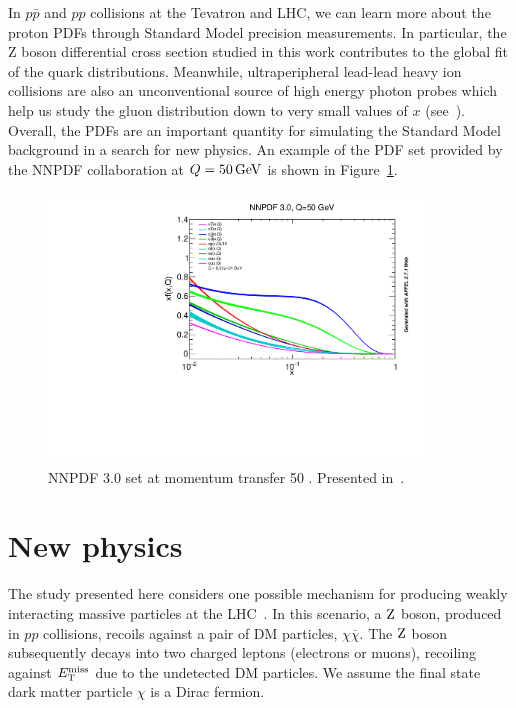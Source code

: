 In $p\bar{p}$ and $pp$ collisions at the Tevatron and LHC,
we can learn more about the proton PDFs through Standard Model precision measurements.
In particular, the Z boson differential cross section studied in this work contributes to the global fit of the quark distributions.
Meanwhile, ultraperipheral lead-lead heavy ion collisions are also an unconventional source of high energy photon probes which help us study the gluon distribution down to very small values of $x$ (see~\cite{Baltz:2007kq}).
Overall, the PDFs are an important quantity for simulating the Standard Model background in a search for new physics.
An example of the PDF set provided by the NNPDF collaboration at $Q=50 \,\text{Ge\hspace{-.08em}V}$ is shown in Figure~\ref{fig:pdfq50}.

\begin{figure}[hbtp]
  \centering
    \includegraphics[width=0.90\textwidth]{figures/nnpdf30_115_Q50_v4.pdf}
  \caption{NNPDF 3.0 set at momentum transfer 50 \GeV. Presented in~\cite{nnpdf}.} 
  \label{fig:pdfq50}
\end{figure}

\section{New physics}
\label{sec:bsmtheory}

The study presented here considers one possible mechanism for producing weakly interacting massive particles at the LHC~\cite{Abercrombie:2015wmb}.
In this scenario, a $\mathrm{Z}$ boson, produced in $pp$ collisions, recoils against a pair of DM particles, $\chi\overline\chi$.
The $\mathrm{Z}$ boson subsequently decays into two charged leptons (electrons or muons), 
recoiling against $E_\mathrm{T}^{\mathrm{miss}}$ due to the undetected DM particles. 
We assume the final state dark matter particle $\chi$ is a Dirac fermion.

